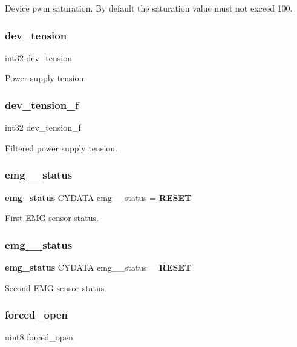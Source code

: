 Device pwm saturation. By default the saturation value must not exceed 100. \mbox{\label{globals_8c_a53a494e9edc739a4f7c884778d1a93b1}} 
\subsubsection{dev\+\_\+tension}
{\footnotesize\ttfamily int32 dev\+\_\+tension}

Power supply tension. \mbox{\label{globals_8c_a600f1f02d397d3ffd8b03b8a4edace02}} 
\subsubsection{dev\+\_\+tension\+\_\+f}
{\footnotesize\ttfamily int32 dev\+\_\+tension\+\_\+f}

Filtered power supply tension. \mbox{\label{globals_8c_a433230c4343adf14967e6f4f9082b199}} 
\subsubsection{emg\+\_\+\_\+status}
{\footnotesize\ttfamily \textbf{ emg\+\_\+status} C\+Y\+D\+A\+TA emg\+\_\+\_\+status = \textbf{ R\+E\+S\+ET}}

First E\+MG sensor status. \mbox{\label{globals_8c_a7eef8180f636a73854d52b58e2be4e51}} 
\subsubsection{emg\+\_\+\_\+status}
{\footnotesize\ttfamily \textbf{ emg\+\_\+status} C\+Y\+D\+A\+TA emg\+\_\+\_\+status = \textbf{ R\+E\+S\+ET}}

Second E\+MG sensor status. \mbox{\label{globals_8c_a0f13b80a0c329fa3176eb1e72ef36fb8}} 
\subsubsection{forced\+\_\+open}
{\footnotesize\ttfamily uint8 forced\+\_\+open}

